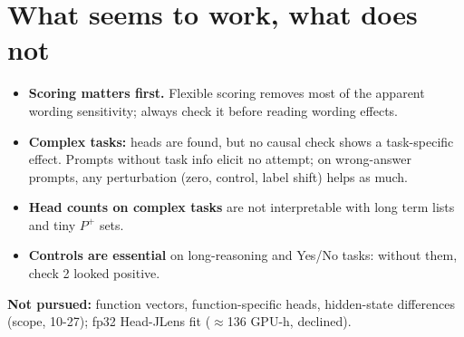 \documentclass[10pt,a4paper]{article}
\newcommand{\yes}{\textcolor{green!45!black}{\ding{51}}}
\newcommand{\no}{\textcolor{red!70!black}{\ding{55}}}
\begin{document}
\section{What seems to work, what does not}

\begin{itemize}
\item \yes{} \textbf{Scoring matters first.} Flexible scoring removes most of the apparent wording sensitivity; always check it before reading wording effects.
\item \no{} \textbf{Complex tasks:} heads are found, but no causal check shows a task-specific effect. Prompts without task info elicit no attempt; on wrong-answer prompts, any perturbation (zero, control, label shift) helps as much.
\item \no{} \textbf{Head counts on complex tasks} are not interpretable with long term lists and tiny $P^+$ sets.
\item \textbf{Controls are essential} on long-reasoning and Yes/No tasks: without them, check 2 looked positive.
\end{itemize}

\textbf{Not pursued:} function vectors, function-specific heads, hidden-state differences (scope, 10-27); fp32 Head-JLens fit ($\approx$136 GPU-h, declined).
\end{document}
